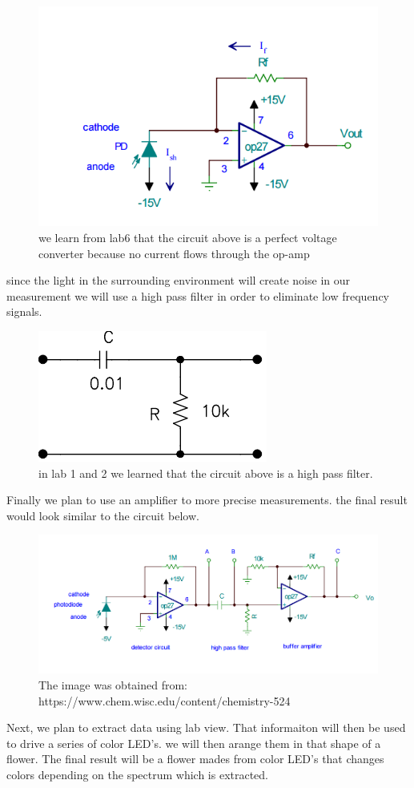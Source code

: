 \documentclass[12pt]{article}
\begin{document}
\begin{figure}[H]
\centering
\includegraphics[scale=.5]{image1.png}
\caption{we learn from lab6 that the circuit above is a perfect voltage converter because no current flows through the op-amp}
\end{figure}

since the light in the surrounding environment will create noise in our measurement we will use a high pass filter in order to eliminate low frequency signals.

\begin{figure}[H]
\centering
\includegraphics[scale=.5]{highpass.png}
\caption{in lab 1 and 2 we learned that the circuit above is a high pass filter.  }
\end{figure}

Finally we plan to use an amplifier to more precise measurements. the final result would look similar to the circuit below.

\begin{figure}[H]
\centering
\includegraphics[scale=.5]{spectrometer.png}
\caption{The image was obtained from:\\ https://www.chem.wisc.edu/content/chemistry-524  }
\end{figure}

Next, we plan to extract data using lab view. That informaiton will then be used to drive a series of color LED's. we will then arange them in that shape of a flower. The final result will be a flower mades from color LED's that changes colors depending on the spectrum which is extracted.
\end{document}
